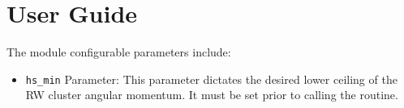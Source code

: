 \documentclass[]{BasiliskReportMemo}
\begin{document}
\section{User Guide}
The module configurable parameters include:
\begin{itemize}
	\item {{\tt hs\_min} Parameter}:
This parameter dictates the desired lower ceiling of the RW cluster angular momentum.  It must be set prior to calling the routine.  
\end{itemize}
\end{document}
